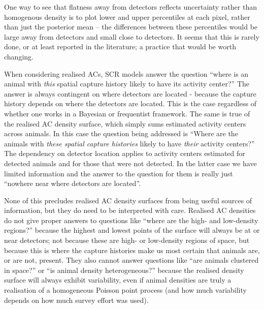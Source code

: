 \documentclass[useAMS,usenatbib,referee]{biom}
\begin{document}
One way to see that flatness away from detectors reflects uncertainty rather than homogenous density is to plot lower and upper percentiles at each pixel, rather than just the posterior mean -- the differences between these percentiles would be large away from detectors and small close to detectors. It seems that this is rarely done, or at least reported in the literature; a practice that would be worth changing. 


When considering realised ACs, SCR models answer the question ``where is an animal with {\it this} spatial capture history likely to have its activity center?'' The answer is always contingent on where detectors are located - because the capture history depends on where the detectors are located. %
This is the case regardless of whether one works in a Bayesian or frequentist framework. The same is true of the realised AC density surface, which simply sums estimated activity centers across animals. In this case the question being addressed is ``Where are the animals with {\it these spatial capture histories} likely to have {\it their} activity centers?'' The dependency on detector location applies to activity centers estimated for detected animals and for those that were not detected. In the latter case we have limited information and the answer to the question for them is really just ``nowhere near where detectors are located''. 

None of this precludes realised AC density surfaces from being useful sources of information, but they do need to be interpreted with care. Realised AC densities do not give proper answers to questions like ``where are the high- and low-density regions?'' because the highest and lowest points of the surface will always be at or near detectors; not because these are high- or low-density regions of space, but because this is where the capture histories make us most certain that animals are, or are not, present. They also cannot answer questions like ``are animals clustered in space?'' or ``is animal density heterogeneous?'' because the realised density surface will always exhibit variability, even if animal densities are truly a realisation of a homogeneous Poisson point process (and how much variability depends on how much survey effort was used).
\end{document}
